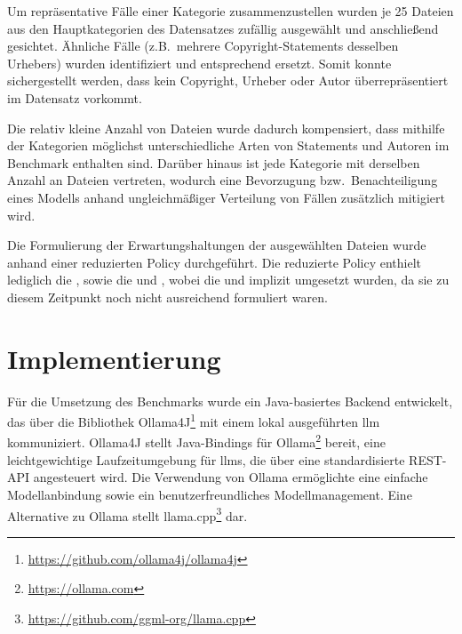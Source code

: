 Um repräsentative Fälle einer Kategorie zusammenzustellen wurden je \num{25} Dateien aus den Hauptkategorien des Datensatzes zufällig ausgewählt und anschließend gesichtet.
Ähnliche Fälle (z.B.\ mehrere Copyright-Statements desselben Urhebers) wurden identifiziert und entsprechend ersetzt.
Somit konnte sichergestellt werden, dass kein Copyright, Urheber oder Autor überrepräsentiert im Datensatz vorkommt.

Die relativ kleine Anzahl von Dateien wurde dadurch kompensiert, dass mithilfe der Kategorien möglichst unterschiedliche Arten von Statements und Autoren im Benchmark enthalten sind.
Darüber hinaus ist jede Kategorie mit derselben Anzahl an Dateien vertreten, wodurch eine Bevorzugung bzw.\ Benachteiligung eines Modells anhand ungleichmäßiger Verteilung von Fällen zusätzlich mitigiert wird.

Die Formulierung der Erwartungshaltungen der ausgewählten Dateien wurde anhand einer reduzierten Policy durchgeführt.
Die reduzierte Policy enthielt lediglich die , sowie die  und , wobei die  und  implizit umgesetzt wurden, da sie zu diesem Zeitpunkt noch nicht ausreichend formuliert waren.


\section{Implementierung}\label{sec:benchmark-implementierung}

Für die Umsetzung des Benchmarks wurde ein Java-basiertes Backend entwickelt, das über die Bibliothek Ollama4J\footnote{\url{https://github.com/ollama4j/ollama4j}} mit einem lokal ausgeführten \gls{llm} kommuniziert.
Ollama4J stellt Java-Bindings für Ollama\footnote{\url{https://ollama.com}} bereit, eine leichtgewichtige Laufzeitumgebung für \glspl{llm}, die über eine standardisierte REST-API angesteuert wird.
Die Verwendung von Ollama ermöglichte eine einfache Modellanbindung sowie ein benutzerfreundliches Modellmanagement.
Eine Alternative zu Ollama stellt llama.cpp\footnote{\url{https://github.com/ggml-org/llama.cpp}} dar.


